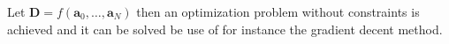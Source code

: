 Let $\textbf{D} = f(\textbf{a}_0, \hdots, \textbf{a}_N)$ then an optimization problem without constraints is achieved and it can be solved be use of for instance the gradient decent method.

   

